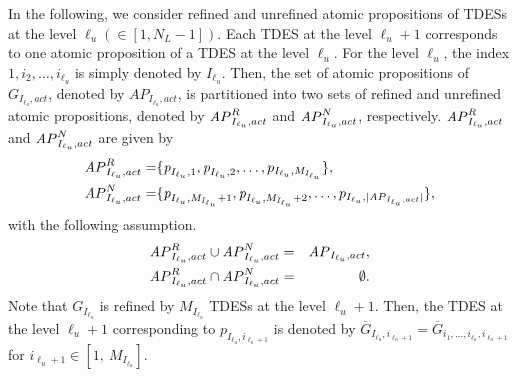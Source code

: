 \documentclass{article}
\newcommand{\AP}{{\textit AP}}
\newcommand{\Iu}{I_{\ell_u}}
\begin{document}
In the following, we consider refined and unrefined atomic propositions of TDESs at the level $\ell_u(\in[1,N_L-1])$.
Each TDES at the level $\ell_u+1$ corresponds to one atomic proposition of a TDES at the level $\ell_u$. %
For the level $\ell_u$, the index $1,i_2,\ldots,i_{\ell_u}$ is simply denoted by $\Iu$.
Then, the set of atomic propositions of $G_{{\Iu},act}$, denoted by $AP_{{\Iu},act}$, is partitioned into two sets of refined and unrefined atomic propositions, denoted by $\AP_{\Iu,act}^{R}$ and $\AP_{\Iu,act}^{N}$, respectively.
%
$\AP_{\Iu,act}^R$ and $\AP_{\Iu,act}^N$ are given by
\begin{align}
\AP_{\Iu,act}^R=&\{\textit{p}_{\Iu,1},\textit{p}_{\Iu,2},\ldots,p_{\Iu,M_{\Iu}}\}, \notag \\
\AP_{\Iu,act}^N=&\{\textit{p}_{\Iu,M_{\Iu}+1},\textit{p}_{\Iu,M_{\Iu}+2},\ldots,p_{\Iu,|\AP_{\Iu,act}|}\},\notag 
\end{align}
%
with the following assumption.
%
\begin{eqnarray}
\AP_{\Iu,act}^R \cup \AP_{\Iu,act}^N&=&\AP_{\Iu,act},\notag \\
\AP_{\Iu,act}^R \cap \AP_{\Iu,act}^N&=&\emptyset.\notag
\end{eqnarray}
%
Note that $G_{\Iu}$ is refined by $M_{\Iu}$ TDESs at the level $\ell_u+1$.
Then, the TDES at the level $\ell_u+1$ corresponding to  $\textit{p}_{\Iu,i_{\ell_u+1}}$ is denoted by $\overline{G}_{\Iu,i_{\ell_u+1}}=\overline{G}_{i_1,\ldots,i_{\ell_u},i_{\ell_u+1}}$ for $i_{\ell_u+1}\in[1,~M_{\Iu}]$. 
%
\end{document}
